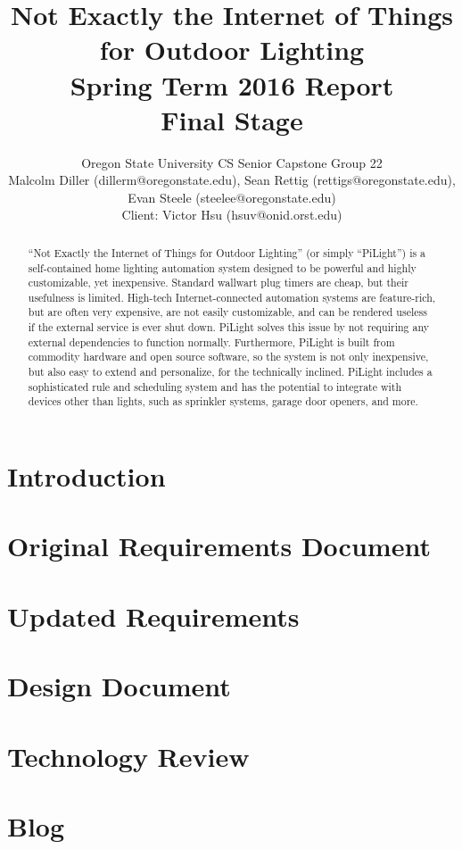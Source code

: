\documentclass[10pt,draftclsnofoot,onecolumn]{IEEEtran}
\title{Not Exactly the Internet of Things for Outdoor Lighting\\ Spring Term 2016 Report\\ Final Stage}
\author{Oregon State University CS Senior Capstone Group 22\\Malcolm Diller (dillerm@oregonstate.edu), Sean Rettig (rettigs@oregonstate.edu), Evan Steele (steelee@oregonstate.edu)\\Client: Victor Hsu (hsuv@onid.orst.edu)}
\begin{document}
\maketitle
\begin{abstract}

``Not Exactly the Internet of Things for Outdoor Lighting'' (or simply
``PiLight'') is a self-contained home lighting automation system designed to be
powerful and highly customizable, yet inexpensive.  Standard wallwart plug
timers are cheap, but their usefulness is limited.  High-tech
Internet-connected automation systems are feature-rich, but are often very
expensive, are not easily customizable, and can be rendered useless if the
external service is ever shut down.  PiLight solves this issue by not requiring
any external dependencies to function normally.  Furthermore, PiLight is built
from commodity hardware and open source software, so the system is not only
inexpensive, but also easy to extend and personalize, for the technically
inclined.  PiLight includes a sophisticated rule and scheduling system and has
the potential to integrate with devices other than lights, such as sprinkler
systems, garage door openers, and more.

\end{abstract}
\newpage
\tableofcontents
\newpage
\section{Introduction}

\section{Original Requirements Document}

\section{Updated Requirements}

\section{Design Document}

\section{Technology Review}

\section{Blog}

\end{document}
